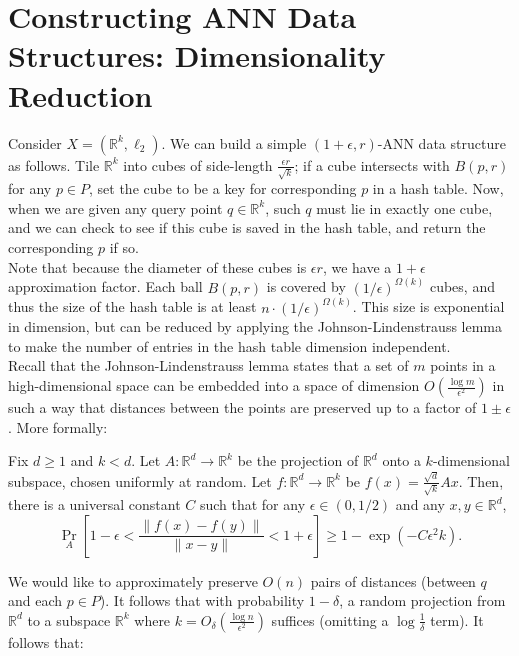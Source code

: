 \section{Constructing ANN Data Structures: Dimensionality Reduction}

Consider $X = (\mathbb{R}^k, \ell_2)$. We can build a simple $(1+\epsilon, r)$-ANN data structure as follows.
Tile $\mathbb{R}^k$ into cubes of side-length $\frac{\epsilon r}{\sqrt{k}}$; if a cube intersects with $B(p, r)$
for any $p \in P$, set the cube to be a key for corresponding $p$ in a hash table. Now, when we are given any
query point $q \in \mathbb{R}^k$, such $q$ must lie in exactly one cube, and we can check to see if this cube
is saved in the hash table, and return the corresponding $p$ if so. \\

Note that because the diameter of these cubes is $\epsilon r$, we have a $1 + \epsilon$ approximation factor.
Each ball $B(p, r)$ is covered by $(1/\epsilon)^{\Omega(k)}$ cubes, and thus the size of the hash table is at
least $n \cdot (1/\epsilon)^{\Omega(k)}$. This size is exponential in dimension, but can be reduced by applying
the Johnson-Lindenstrauss lemma to make the number of entries in the hash table dimension independent. \\

Recall that the Johnson-Lindenstrauss lemma states that a set of $m$ points in a high-dimensional space can be embedded
into a space of dimension $O(\frac{\log m}{\epsilon^2})$ in such a way that distances between the points are
preserved up to a factor of $1 \pm \epsilon$. More formally:

\begin{lemma}
Fix $d \geq 1$ and $k < d$. Let $A : \mathbb{R}^d \to \mathbb{R}^k$ be the projection of $\mathbb{R}^d$ onto a $k$-dimensional subspace, chosen uniformly at random. Let $f: \mathbb{R}^d \to \mathbb{R}^k$ be $f(x) = \frac{\sqrt{d}}{\sqrt{k}} Ax$.  Then, there is a universal constant $C$ such that for any $\epsilon \in (0,1/2)$ and any $x,y \in \mathbb{R}^d$,
\[\Pr_A \left[1 - \epsilon < \frac{\|f(x) - f(y)\|}{\|x - y\|} < 1 + \epsilon\right] \geq 1 - \exp\left(- C\epsilon^2 k\right).\]
\end{lemma}

We would like to approximately preserve $O(n)$ pairs of distances (between $q$ and each $p \in P$). It follows that with probability $1 - \delta$, a random projection from $\mathbb{R}^d$ to a subspace $\mathbb{R}^k$ where $k = O_\delta\left(\frac{\log n}{\epsilon^2}\right)$ suffices (omitting a $\log \frac{1}{\delta}$ term). It follows that:

